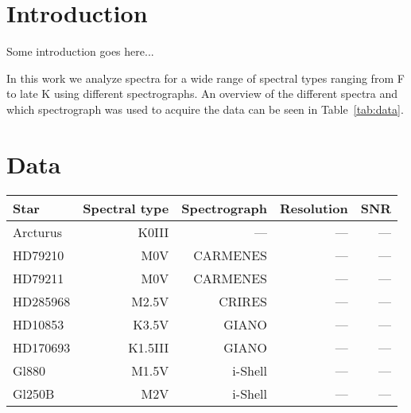\documentclass{aa}
\begin{document}
\maketitle



\section{Introduction}
\label{sec:introduction}

Some introduction goes here...

In this work we analyze spectra for a wide range of spectral types
ranging from F to late K using different spectrographs. An overview
of the different spectra and which spectrograph was used to acquire the
data can be seen in Table~\ref{tab:data}.





\section{Data}
\label{sec:data}

\begin{table*}[htb!]
    \caption{The spectra and spectral type (from Simbad) of our sample with
             the corresponding spectrograph used to acquire the data and its
             spectra resolution. In the last column we show the SNR measured
             with splot in IRAF.}
    \label{tab:data}
    \centering
    \begin{tabular}{lrrrr}
      \hline\hline
        Star      & Spectral type & Spectrograph  & Resolution   &  SNR  \\
      \hline
        Arcturus  &      K0III    &  ---          &    ---       &  ---  \\
        HD79210   &      M0V      & CARMENES      &    ---       &  ---  \\
        HD79211   &      M0V      & CARMENES      &    ---       &  ---  \\
        HD285968  &      M2.5V    & CRIRES        &    ---       &  ---  \\
        HD10853   &      K3.5V    & GIANO         &    ---       &  ---  \\
        HD170693  &      K1.5III  & GIANO         &    ---       &  ---  \\
        Gl880     &      M1.5V    & i-Shell       &    ---       &  ---  \\
        Gl250B    &      M2V      & i-Shell       &    ---       &  ---  \\
    \end{tabular}
\end{table*}
\end{document}
